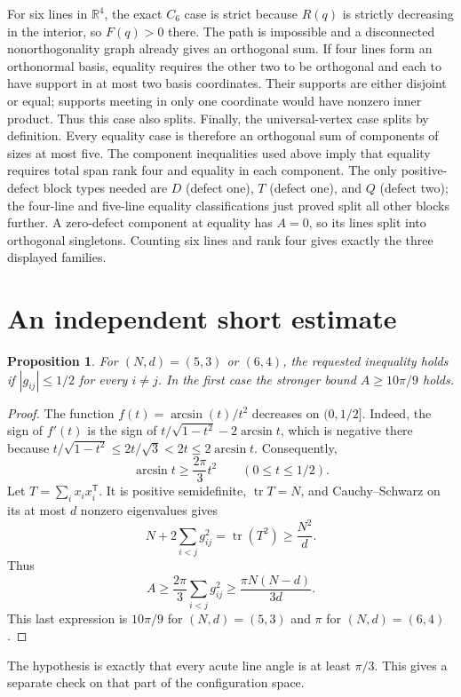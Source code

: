 \documentclass[11pt]{article}
\newtheorem{proposition}{Proposition}
\begin{document}
For six lines in $\mathbb R^4$, the exact $C_6$ case is strict because
$R(q)$ is strictly decreasing in the interior, so $F(q)>0$ there.
The path is impossible and a disconnected nonorthogonality graph
already gives an orthogonal sum.  If four lines form an orthonormal
basis, equality requires the other two to be orthogonal and each
to have support in at most two basis coordinates.  Their supports
are either disjoint or equal; supports meeting in only one coordinate
would have nonzero inner product.  Thus this case
also splits.  Finally, the universal-vertex case splits by definition.
Every equality case is therefore an orthogonal sum of components
of sizes at most five.  The component inequalities used above imply
that equality requires total span rank four and equality in each
component.  The only positive-defect block types needed are
$D$ (defect one), $T$ (defect one), and $Q$ (defect two); the
four-line and five-line equality classifications just proved split
all other blocks further.  A zero-defect component at equality has
$A=0$, so its lines split into orthogonal singletons.  Counting
six lines and rank four gives
exactly the three displayed families.


\section*{An independent short estimate}

\begin{proposition}
For $(N,d)=(5,3)$ or $(6,4)$, the requested inequality holds if
$|g_{ij}|\leq 1/2$ for every $i\ne j$.  In the first case the stronger
bound $A\geq 10\pi/9$ holds.
\end{proposition}
\begin{proof}
The function $f(t)=\arcsin(t)/t^2$ decreases on $(0,1/2]$.  Indeed,
the sign of $f'(t)$ is the sign of
$t/\sqrt{1-t^2}-2\arcsin t$, which is negative there because
$t/\sqrt{1-t^2}\leq 2t/\sqrt3<2t\leq2\arcsin t$.
Consequently,
\[
  \arcsin t\geq \frac{2\pi}{3}t^2
  \qquad (0\leq t\leq 1/2).
\]
Let $T=\sum_i x_i x_i^{\mathsf T}$.  It is positive semidefinite,
$\operatorname{tr}T=N$, and Cauchy--Schwarz on its at most $d$
nonzero eigenvalues gives
\[
 N+2\sum_{i<j}g_{ij}^2
 =\operatorname{tr}(T^2)\geq \frac{N^2}{d}.
\]
Thus
\[
 A\geq\frac{2\pi}{3}\sum_{i<j}g_{ij}^2
 \geq \frac{\pi N(N-d)}{3d}.
\]
This last expression is $10\pi/9$ for $(N,d)=(5,3)$ and
$\pi$ for $(N,d)=(6,4)$.
\end{proof}

The hypothesis is exactly that every acute line angle is at least
$\pi/3$.  This gives a separate check on that part of the
configuration space.
\end{document}
